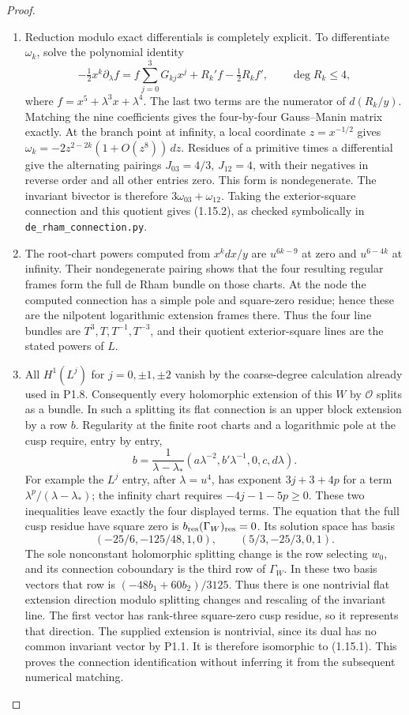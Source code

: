 \begin{proof}
\begin{enumerate}[label=\arabic*.]
\item Reduction modulo exact differentials is completely explicit.  To
differentiate $\omega_k$, solve the polynomial identity
\[
-\tfrac12x^k\partial_\lambda f
 =f\sum_{j=0}^3G_{kj}x^j+R_k'f-\tfrac12R_kf',
 \qquad\deg R_k\leq4,
\]
where $f=x^5+\lambda^3x+\lambda^4$.  The last two terms are the
numerator of $d(R_k/y)$.  Matching the nine coefficients gives the
four-by-four Gauss--Manin matrix exactly.
At the branch point at infinity, a local coordinate $z=x^{-1/2}$
gives $\omega_k=-2z^{2-2k}(1+O(z^8))\,dz$.
Residues of a primitive times a differential give the alternating
pairings $J_{03}=4/3$, $J_{12}=4$, with their negatives in reverse
order and all other entries zero.  This form is nondegenerate.
The invariant bivector is therefore $3\omega_{03}+\omega_{12}$.
Taking the exterior-square connection and this quotient gives
(1.15.2), as checked symbolically in \texttt{de\_rham\_connection.py}.

\item The root-chart powers computed from $x^kdx/y$ are
$u^{6k-9}$ at zero and $u^{6-4k}$ at infinity.
Their nondegenerate pairing shows that the four resulting regular
frames form the full de Rham bundle on those charts.  At the node
the computed connection has a simple pole and square-zero residue;
hence these are the nilpotent logarithmic extension frames there.
Thus the four line bundles are
$T^3,T,T^{-1},T^{-3}$, and their quotient exterior-square lines are
the stated powers of $L$.

\item All $H^1(L^j)$ for $j=0,\pm1,\pm2$ vanish by the coarse-degree
calculation already used in P1.8.  Consequently every holomorphic
extension of this $W$ by $\mathcal O$ splits as a bundle.
In such a splitting its flat connection is an upper block extension
by a row $b$.  Regularity at the finite root charts and a logarithmic
pole at the cusp require, entry by entry,
\[
b=\frac1{\lambda-\lambda_*}
 (a\lambda^{-2},b'\lambda^{-1},0,c,d\lambda).
\]
For example the $L^j$ entry, after $\lambda=u^4$, has exponent
$3j+3+4p$ for a term $\lambda^p/ (\lambda-\lambda_*)$;
the infinity chart requires $-4j-1-5p\geq0$.
These two inequalities leave exactly the four displayed terms.
The equation that the full cusp residue have square zero is
$b_{\rm res}(\Gamma_W)_{\rm res}=0$.
Its solution space has basis
\[
(-25/6,-125/48,1,0),\qquad(5/3,-25/3,0,1).
\]
The sole nonconstant holomorphic splitting change is the row selecting
$w_0$, and its connection coboundary is the third row of $\Gamma_W$.
In these two basis vectors that row is $(-48b_1+60b_2)/3125$.
Thus there is one nontrivial flat extension direction modulo splitting
changes and rescaling of the invariant line.  The first vector has
rank-three square-zero cusp residue, so it represents that direction.
The supplied extension is nontrivial, since its dual has no common
invariant vector by P1.1.  It is therefore isomorphic to (1.15.1).
This proves the connection identification without inferring it from
the subsequent numerical matching.


\end{enumerate}
\end{proof}
